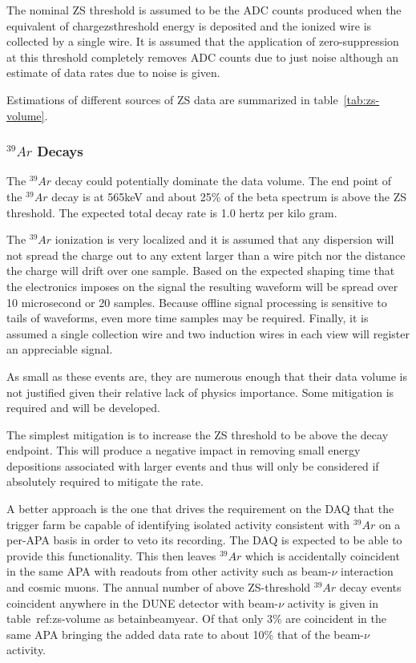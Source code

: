 The nominal ZS threshold is assumed to be the ADC counts produced when
the equivalent of chargezsthreshold energy is deposited and the
ionized wire is collected by a single wire.
It is assumed that the application of zero-suppression at this
threshold completely removes ADC counts due to just noise although an
estimate of data rates due to noise is given.

Estimations of different sources of ZS data are summarized in table~\ref{tab:zs-volume}.

%

\subsubsection{$^{39}Ar$ Decays}

The $^{39}Ar$ decay could potentially dominate the data volume.
The end point of the $^{39}Ar$ decay is at 565keV and about
25\% of the beta spectrum is above the ZS threshold\cite{docdb3018}.
The expected total decay rate is
1.0 hertz per kilo gram\cite{bkds}.

The $^{39}Ar$ ionization is very localized and it is assumed that any
dispersion will not spread the charge out to any extent larger than a
wire pitch nor the distance the charge will drift over one sample.
Based on the expected shaping time that the electronics imposes on the
signal the resulting waveform will be spread over
10 microsecond or 20 samples.
Because offline signal processing is sensitive to tails of waveforms,
even more time samples may be required.
Finally, it is assumed a single collection wire and two induction
wires in each view will register an appreciable signal.

As small as these events are, they are numerous enough that their data
volume is not justified given their relative lack of physics importance.
Some mitigation is required and will be developed.

The simplest mitigation is to increase the ZS threshold to be above
the decay endpoint.
This will produce a negative impact in removing small energy
depositions associated with larger events and thus will only be
considered if absolutely required to mitigate the rate.

A better approach is the one that drives the requirement on the DAQ
that the trigger farm be capable of identifying isolated activity
consistent with $^{39}Ar$ on a per-APA basis in order to veto its
recording.
The DAQ is expected to be able to provide this functionality.
This then leaves $^{39}Ar$ which is accidentally coincident in the
same APA with readouts from other activity such as beam-$\nu$
interaction and cosmic muons.
The annual number of above ZS-threshold $^{39}Ar$ decay events
coincident anywhere in the DUNE detector with beam-$\nu$ activity is
given in table~{ref:zs-volume} as betainbeamyear.
Of that only 3\% are coincident in the same APA bringing the added
data rate to about 10\% that of the beam-$\nu$ activity.

